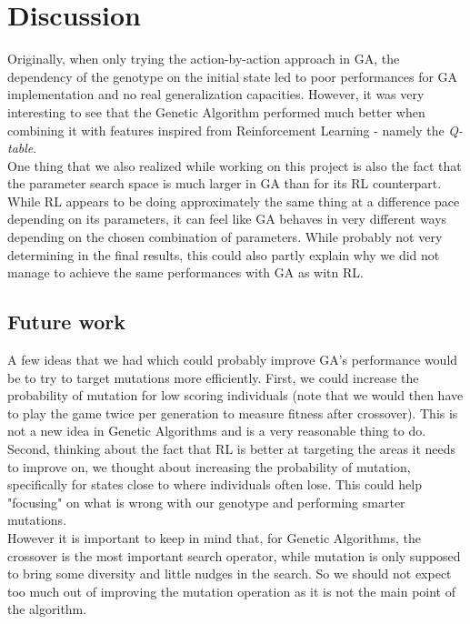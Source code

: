 \section{Discussion}
Originally, when only trying the action-by-action approach in GA, the dependency of the genotype on the initial state led to poor performances for GA implementation and no real generalization capacities.
However, it was very interesting to see that the Genetic Algorithm performed much better when combining it with features inspired from Reinforcement Learning - namely the \textit{Q-table}.
\\
One thing that we also realized while working on this project is also the fact that the parameter search space is much larger in GA than for its RL counterpart. 
While RL appears to be doing approximately the same thing at a difference pace depending on its parameters, it can feel like GA behaves in very different ways depending on the chosen combination of parameters.
While probably not very determining in the final results, this could also partly explain why we did not manage to achieve the same performances with GA as witn RL.
\\

\subsection{Future work}
A few ideas that we had which could probably improve GA's performance would be to try to target mutations more efficiently.
First, we could increase the probability of mutation for low scoring individuals (note that we would then have to play the game twice per generation to measure fitness after crossover).
This is not a new idea in Genetic Algorithms and is a very reasonable thing to do.
\\
Second, thinking about the fact that RL is better at targeting the areas it needs to improve on, we thought about increasing the probability of mutation, specifically for states close to where individuals often lose.
This could help "focusing" on what is wrong with our genotype and performing smarter mutations.
\\
However it is important to keep in mind that, for Genetic Algorithms, the crossover is the most important search operator, while mutation is only supposed to bring some diversity and little nudges in the search.
So we should not expect too much out of improving the mutation operation as it is not the main point of the algorithm.

